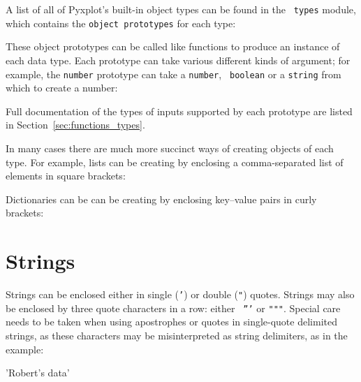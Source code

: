 A list of all of Pyxplot's built-in object types can be found in the {\tt
types} module, which contains the {\tt object prototypes} for each type:

\vspace{3mm}

\vspace{3mm}

\noindent These object prototypes can be called like functions to produce an
instance of each data type. Each prototype can take various different kinds of
argument; for example, the {\tt number} prototype can take a {\tt number}, {\tt
boolean} or a {\tt string} from which to create a number:

\vspace{3mm}

\vspace{3mm}

\noindent Full documentation of the types of inputs supported by each prototype
are listed in Section~\ref{sec:functions_types}.

In many cases there are much more succinct ways of creating objects of each type. For example, lists can be creating by enclosing a comma-separated list of elements in square brackets:

\vspace{3mm}

\vspace{3mm}

\noindent Dictionaries can be can be creating by enclosing key--value pairs in curly brackets:

\vspace{3mm}

\vspace{3mm}


\section{Strings}
\label{sec:stringvars}

Strings can be enclosed either in single ({\tt '}) or double ({\tt "}) quotes.
Strings may also be enclosed by three quote characters in a row: either {\tt
'''} or {\tt """}. Special care needs to be taken when using apostrophes or
quotes in single-quote delimited strings, as these characters may be
misinterpreted as string delimiters, as in the example:

\begin{dontdo}
'Robert's data'
\end{dontdo}

